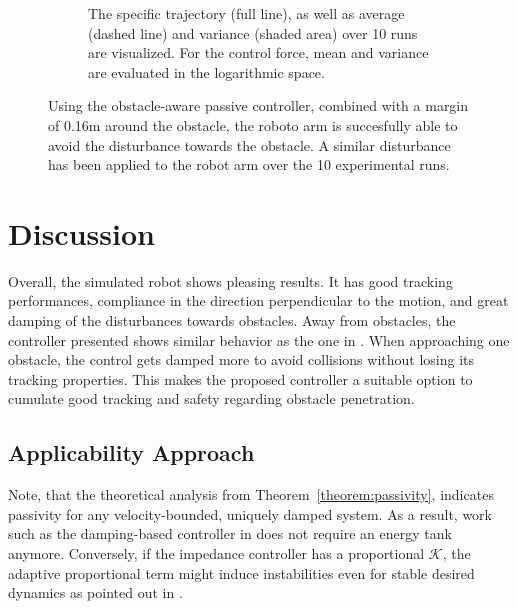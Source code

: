 \begin{figure}
\begin{subfigure}{\columnwidth}
      \caption{The specific trajectory (full line), as well as average (dashed line) and variance (shaded area) over 10 runs are visualized. For the control force, mean and variance are evaluated in the logarithmic space.}
      \label{fig:trajectory_comparison_force_and_distance}
    \end{subfigure}
	\caption{Using the obstacle-aware passive controller, combined with a margin of 0.16m around the obstacle, the roboto arm is succesfully able to avoid the disturbance towards the obstacle. A similar disturbance has been applied to the robot arm over the 10 experimental runs. }  
    \label{fig:evaluation_on_robot_arm}
\end{figure}

\section{Discussion}
Overall, the simulated robot shows pleasing results. It has good tracking performances, compliance in the direction perpendicular to the motion, and great damping of the disturbances towards obstacles.
Away from obstacles, the controller presented shows similar behavior as the one in \cite{kronander2015passive}. When approaching one obstacle, the control gets damped more to avoid collisions without losing its tracking properties. This makes the proposed controller a suitable option to cumulate good tracking and safety regarding obstacle penetration.

\subsection{Applicability Approach}
Note, that the theoretical analysis from Theorem~\ref{theorem:passivity}, indicates passivity for any velocity-bounded, uniquely damped system. As a result, work such as the damping-based controller in  \cite{kronander2015passive} does not require an energy tank anymore.
Conversely, if the impedance controller has a proportional $\mathcal{K}$, the adaptive proportional term might induce instabilities even for stable desired dynamics as pointed out in \cite{ferraguti2013tank, kronander2016stability}.
